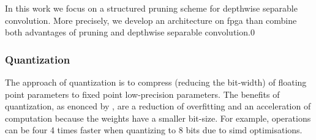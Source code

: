 In this work we focus on a structured pruning scheme for depthwise separable convolution. More precisely, we develop an architecture on \acrshort{fpga} than combine both advantages of pruning and depthwise separable convolution.0
%
%
\subsubsection{Quantization} \label{subs:quantization}
The approach of quantization is to compress (reducing the bit-width) of floating point parameters to fixed point low-precision parameters. The benefits of quantization, as enonced by \cite{joos_de_ter_beerst_accelerating_2019}, are a reduction of overfitting and an acceleration of computation because the weights have a smaller bit-size. For example, operations can be four 4 times faster when quantizing to 8 bits due to \acrshort{simd} optimisations.

